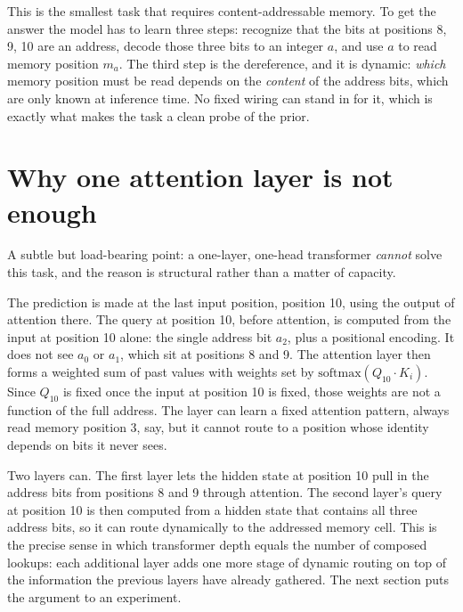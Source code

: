 This is the smallest task that requires content-addressable memory. To get
the answer the model has to learn three steps: recognize that the bits at
positions 8, 9, 10 are an address, decode those three bits to an integer $a$,
and use $a$ to read memory position $m_a$. The third step is the dereference,
and it is dynamic: \emph{which} memory position must be read depends on the
\emph{content} of the address bits, which are only known at inference time. No
fixed wiring can stand in for it, which is exactly what makes the task a clean
probe of the prior.

\section{Why one attention layer is not enough}\label{sec:one-layer-limit}

A subtle but load-bearing point: a one-layer, one-head transformer
\emph{cannot} solve this task, and the reason is structural rather than a
matter of capacity.

The prediction is made at the last input position, position 10, using the
output of attention there. The query at position 10, before attention, is
computed from the input at position 10 alone: the single address bit $a_2$,
plus a positional encoding. It does not see $a_0$ or $a_1$, which sit at
positions 8 and 9. The attention layer then forms a weighted sum of past
values with weights set by $\mathrm{softmax}(Q_{10} \cdot K_i)$. Since
$Q_{10}$ is fixed once the input at position 10 is fixed, those weights are
not a function of the full address. The layer can learn a fixed attention
pattern, always read memory position 3, say, but it cannot route to a
position whose identity depends on bits it never sees.

Two layers can. The first layer lets the hidden state at position 10 pull in
the address bits from positions 8 and 9 through attention. The second layer's
query at position 10 is then computed from a hidden state that contains all
three address bits, so it can route dynamically to the addressed memory cell.
This is the precise sense in which transformer depth equals the number of
composed lookups: each additional layer adds one more stage of dynamic
routing on top of the information the previous layers have already gathered.
The next section puts the argument to an experiment.
